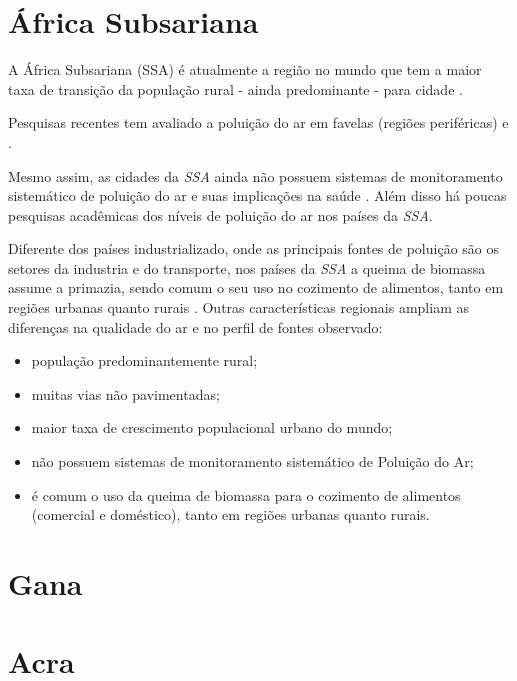 \section{África Subsariana}

A África Subsariana (SSA) é atualmente a região no mundo que tem a maior taxa de transição 
da população rural - ainda predominante - para cidade \citep{MONTGOMERY2008}.

Pesquisas recentes tem avaliado a poluição do ar em favelas 
(regiões periféricas) \citep{SCLAR2005} e \citep{RILEY2007}. 

Mesmo assim, as cidades da \textit{SSA} ainda não possuem sistemas de 
monitoramento sistemático de poluição do ar e suas implicações na saúde 
\citep{EZZATI2004}. 
Além disso há poucas pesquisas acadêmicas dos níveis de poluição do ar nos 
países da \textit{SSA}.

Diferente dos países industrializado, onde as principais fontes de poluição 
são os setores da industria e do transporte, nos países da \textit{SSA} a 
queima de biomassa assume a primazia, sendo comum o seu uso no cozimento 
de alimentos, tanto em regiões urbanas quanto rurais \citep{SMITH2004}. 
Outras características regionais ampliam as diferenças na qualidade do ar 
e no perfil de fontes observado:

\begin{itemize}
  \item população predominantemente rural;
  \item muitas vias não pavimentadas;
  \item maior taxa de crescimento populacional urbano do mundo;
  \item não possuem sistemas de monitoramento sistemático de Poluição do Ar;
  \item é comum o uso da queima de biomassa para o cozimento de alimentos  
        (comercial e doméstico), tanto em regiões urbanas quanto rurais.
\end{itemize}


\section{Gana}

\section{Acra}

